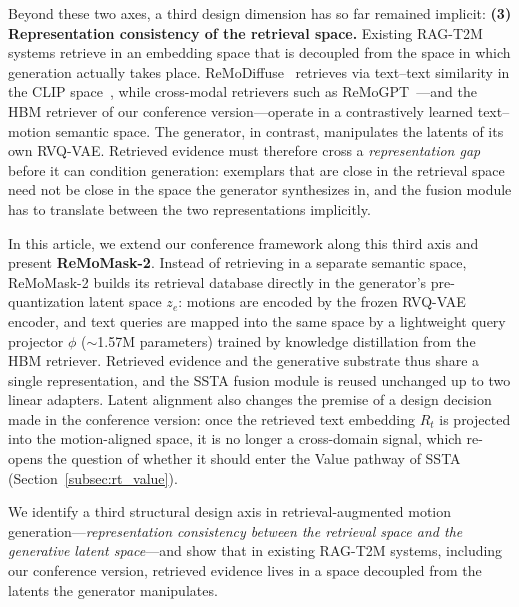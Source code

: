 Beyond these two axes, a third design dimension has so far remained implicit: \textbf{(3) Representation consistency of the retrieval space.} Existing RAG-T2M systems retrieve in an embedding space that is decoupled from the space in which generation actually takes place. ReMoDiffuse~\cite{remodiffuse} retrieves via text--text similarity in the CLIP space~\cite{clip}, while cross-modal retrievers such as ReMoGPT~\cite{remogpt}---and the HBM retriever of our conference version---operate in a contrastively learned text--motion semantic space. The generator, in contrast, manipulates the latents of its own RVQ-VAE. Retrieved evidence must therefore cross a \emph{representation gap} before it can condition generation: exemplars that are close in the retrieval space need not be close in the space the generator synthesizes in, and the fusion module has to translate between the two representations implicitly.

In this article, we extend our conference framework along this third axis and present \textbf{ReMoMask-2}. Instead of retrieving in a separate semantic space, ReMoMask-2 builds its retrieval database directly in the generator's pre-quantization latent space $z_e$: motions are encoded by the frozen RVQ-VAE encoder, and text queries are mapped into the same space by a lightweight query projector $\phi$ ($\sim$1.57M parameters) trained by knowledge distillation from the HBM retriever. Retrieved evidence and the generative substrate thus share a single representation, and the SSTA fusion module is reused unchanged up to two linear adapters. Latent alignment also changes the premise of a design decision made in the conference version: once the retrieved text embedding $R_t$ is projected into the motion-aligned space, it is no longer a cross-domain signal, which re-opens the question of whether it should enter the Value pathway of SSTA (Section~\ref{subsec:rt_value}).


    \item We identify a third structural design axis in retrieval-augmented motion generation---\emph{representation consistency between the retrieval space and the generative latent space}---and show that in existing RAG-T2M systems, including our conference version, retrieved evidence lives in a space decoupled from the latents the generator manipulates.

